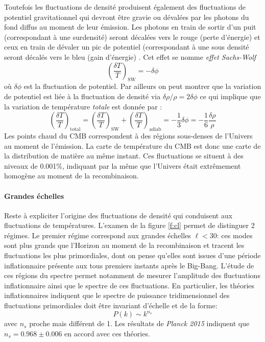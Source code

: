 Toutefois les fluctuations de densité produisent également des fluctuations de potentiel gravitationnel qui devront être gravie ou dévalées par les photons du fond diffus au moment de leur émission. Les photons en train de sortir d'un puit (correspondant à une surdensité) seront décalées vers le rouge (perte d'énergie) et ceux en train de dévaler un pic de potentiel (correspondant à une sous densité seront décalés vers le bleu (gain d'énergie) . Cet effet se nomme \textit{effet Sachs-Wolf}
\begin{equation}
\left(\frac{\delta T}{T}\right)_\mathrm{SW}=-\delta\phi
\end{equation}
où $\delta \phi$ est la fluctuation de potentiel. Par ailleurs on peut montrer que la variation de potentiel est liée à la fluctuation de densité via $\delta \rho/\rho=2\delta \phi$ ce qui implique que la variation de température \textit{totale} est donnée par :
\begin{equation}
\left(\frac{\delta T}{T}\right)_\mathrm{total}=\left(\frac{\delta T}{T}\right)_\mathrm{SW}+\left(\frac{\delta T}{T}\right)_\mathrm{adiab}=-\frac{1}{3}\delta \phi=-\frac{1}{6}\frac{\delta \rho}{\rho}
\end{equation}
Les points chaud du CMB correspondent à des régions sous-denses de l'Univers au moment de l'émission. La carte de température du CMB est donc une carte de la distribution de matière au même instant. Ces fluctuations se situent à des niveaux de 0.001\%, indiquant par la même que l'Univers était extrêmement homogène au moment de la recombinaison.

\paragraph{Grandes échelles} Reste à expliciter l'origine des fluctuations de densité qui conduisent aux fluctuations de températures. L'examen de la figure \ref{f:cl} permet de distinguer 2 régimes. Le premier régime correspond aux grandes échelles $\ell<30$: ces modes sont plus grands que l'Horizon au moment de la recombinaison et tracent les fluctuations les plus primordiales, dont on pense qu'elles sont issues d'une période inflationnaire présente aux tous premiers instants après le Big-Bang. L'étude de ces régions du spectre permet notamment de mesurer l'amplitude des fluctuations inflationnaire ainsi que le spectre de ces fluctuations. En particulier, les théories inflationnaires indiquent que le spectre de puissance tridimensionnel des fluctuations primordiales doit être invariant d'échelle et de la forme:
\begin{equation}
P(k)\sim k^{n_s}
\end{equation}
avec $n_s$ proche mais différent de 1. Les résultats de \textit{Planck 2015} indiquent que $n_s=0.968\pm0.006$ en accord avec ces théories.

